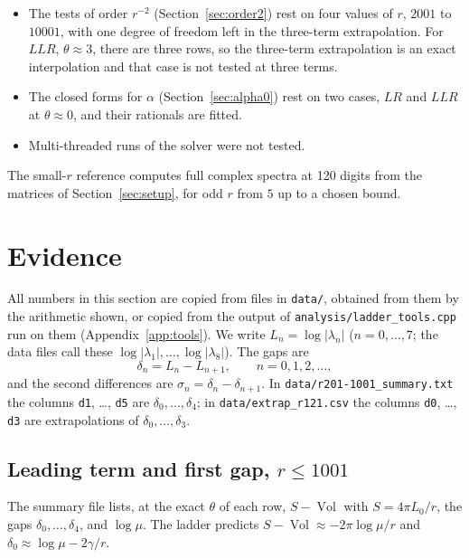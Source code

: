 \documentclass[11pt]{amsart}
\theoremstyle{definition}
\theoremstyle{remark}
\newcommand{\Vol}{\operatorname{Vol}}
\begin{document}
\begin{itemize}
\[\]
on the rows with $r \ge 500$, and $\alpha, \gamma$ are then fitted from
$\beta_{j,0} = \alpha + \gamma(j-\frac12)^2$. The constants
$\beta_{1,0}, \dots, \beta_{8,0}$ are the columns \texttt{b1}, \dots, \texttt{b8} of
the CSV; the other coefficients are not stored. The rows with $500 \le r \le 1001$
that enter this fit are not in the repository (see the previous item).
\item The tests of order $r^{-2}$ (Section~\ref{sec:order2}) rest on four values of
$r$, $2001$ to $10001$, with one degree of freedom left in the three-term
extrapolation. For $LLR$, $\theta \approx 3$, there are three rows, so the three-term
extrapolation is an exact interpolation and that case is not tested at three terms.
\item The closed forms for $\alpha$ (Section~\ref{sec:alpha0}) rest on two cases,
$LR$ and $LLR$ at $\theta \approx 0$, and their rationals are fitted.
\item Multi-threaded runs of the solver were not tested.
\end{itemize}

The small-$r$ reference computes full complex spectra at 120 digits from the
matrices of Section~\ref{sec:setup}, for odd $r$ from $5$ up to a chosen bound.

\section{Evidence}\label{sec:evidence}

All numbers in this section are copied from files in \texttt{data/}, obtained from
them by the arithmetic shown, or copied from the output of
\texttt{analysis/ladder\_tools.cpp} run on them (Appendix~\ref{app:tools}). We write
$L_n = \log|\lambda_n|$ ($n = 0,\dots,7$; the
data files call these $\log|\lambda_1|,\dots,\log|\lambda_8|$). The gaps are
\[
\delta_n = L_n - L_{n+1}, \qquad n = 0, 1, 2, \dots,
\]
and the second differences are $\sigma_n = \delta_n - \delta_{n+1}$. In
\texttt{data/r201-1001\_summary.txt} the columns \texttt{d1}, \dots, \texttt{d5} are
$\delta_0, \dots, \delta_4$; in \texttt{data/extrap\_r121.csv} the columns
\texttt{d0}, \dots, \texttt{d3} are extrapolations of $\delta_0, \dots, \delta_3$.

\subsection{Leading term and first gap, $r \le 1001$}
The summary file lists, at the exact $\theta$ of each row, $S - \Vol$ with
$S = 4\pi L_0/r$, the gaps $\delta_0, \dots, \delta_4$, and $\log\mu$. The ladder
predicts $S - \Vol \approx -2\pi\log\mu/r$ and $\delta_0 \approx \log\mu - 2\gamma/r$.
\end{document}
